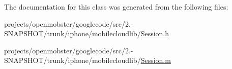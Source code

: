 \-The documentation for this class was generated from the following files\-:\begin{DoxyCompactItemize}
\item 
projects/openmobster/googlecode/src/2.-\/\-S\-N\-A\-P\-S\-H\-O\-T/trunk/iphone/mobilecloudlib/\hyperlink{_session_8h}{\-Session.\-h}\item 
projects/openmobster/googlecode/src/2.-\/\-S\-N\-A\-P\-S\-H\-O\-T/trunk/iphone/mobilecloudlib/\hyperlink{_session_8m}{\-Session.\-m}\end{DoxyCompactItemize}
